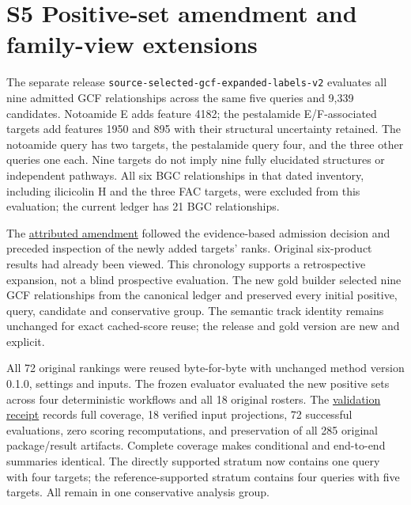\documentclass[
  10pt,
  a4paper,
]{article}
\begin{document}
\section{S5 Positive-set amendment and family-view extensions}\label{s5-positive-set-amendment-and-family-view-extensions}

The separate release \nolinkurl{source-selected-gcf-expanded-labels-v2} evaluates all nine admitted GCF relationships across the same five queries and 9,339 candidates. Notoamide E adds feature 4182; the pestalamide E/F-associated targets add features 1950 and 895 with their structural uncertainty retained. The notoamide query has two targets, the pestalamide query four, and the three other queries one each. Nine targets do not imply nine fully elucidated structures or independent pathways. All six BGC relationships in that dated inventory, including ilicicolin H and the three FAC targets, were excluded from this evaluation; the current ledger has 21 BGC relationships.

The \href{https://github.com/vinvomero/fungallink-benchmark/blob/main/data/processed/source-selected-gcf-expanded-labels-v2/analysis-amendment.json}{attributed amendment} followed the evidence-based admission decision and preceded inspection of the newly added targets' ranks. Original six-product results had already been viewed. This chronology supports a retrospective expansion, not a blind prospective evaluation. The new gold builder selected nine GCF relationships from the canonical ledger and preserved every initial positive, query, candidate and conservative group. The semantic track identity remains unchanged for exact cached-score reuse; the release and gold version are new and explicit.

All 72 original rankings were reused byte-for-byte with unchanged method version 0.1.0, settings and inputs. The frozen evaluator evaluated the new positive sets across four deterministic workflows and all 18 original rosters. The \href{https://github.com/vinvomero/fungallink-benchmark/blob/main/data/processed/source-selected-gcf-expanded-labels-v2-results/validation.json}{validation receipt} records full coverage, 18 verified input projections, 72 successful evaluations, zero scoring recomputations, and preservation of all 285 original package/result artifacts. Complete coverage makes conditional and end-to-end summaries identical. The directly supported stratum now contains one query with four targets; the reference-supported stratum contains four queries with five targets. All remain in one conservative analysis group.
\end{document}
